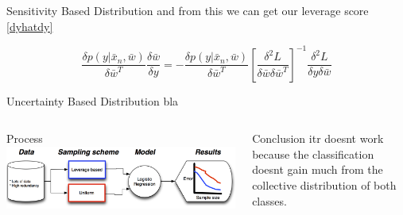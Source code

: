 \documentclass{beamer}
\newenvironment{pblock}{\begin{minipage}[b]{\linewidth}
	\begin{block}}{\end{block} 	\end{minipage}\vspace*{15pt}}
\begin{document}
{\begin{columns}[t]
\begin{column}{.3\linewidth}
\begin{pblock}{Sensitivity Based Distribution}
    	and from this we can get our leverage score \eqref{dyhatdy}
    	
    	\begin{equation*}
    	\frac{\delta p(y|\bar{x}_n,\bar{w})}{\delta \bar{w}^T} \frac{\delta \bar{w}}{\delta y} = - \frac{\delta p(y|\bar{x}_n,\bar{w})}{\delta \bar{w}^T} \left[ \frac{\delta^2 L}{\delta \bar{w} \delta \bar{w}^T} \right]^{-1} \frac{\delta^2 L}{\delta y \delta \bar{w}}
    	\end{equation*}
    	\end{pblock}
    	
    
    \begin{pblock}{Uncertainty Based Distribution}
    	bla
    	\end{pblock}
    
    
    \end{column}
  \end{columns}
\begin{columns}
	\begin{column}{.61\linewidth}
		\begin{block}{Process}
			\includegraphics[width=\linewidth]{ThoughModel.png}
		  
		\end{block}
	\end{column}
	\begin{column}{.3\linewidth}
			\begin{block}{Conclusion}
				itr doesnt work because the classification doesnt gain much from the collective distribution of both classes.
			\end{block}
	\end{column}
\end{columns}	
	
  }
\end{document}
